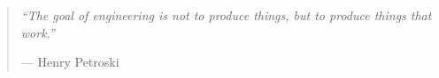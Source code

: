 \begin{quote}
\itshape
``The goal of engineering is not to produce things, but to produce things that work.''

\medskip
\upshape\raggedleft --- Henry Petroski
\end{quote}
